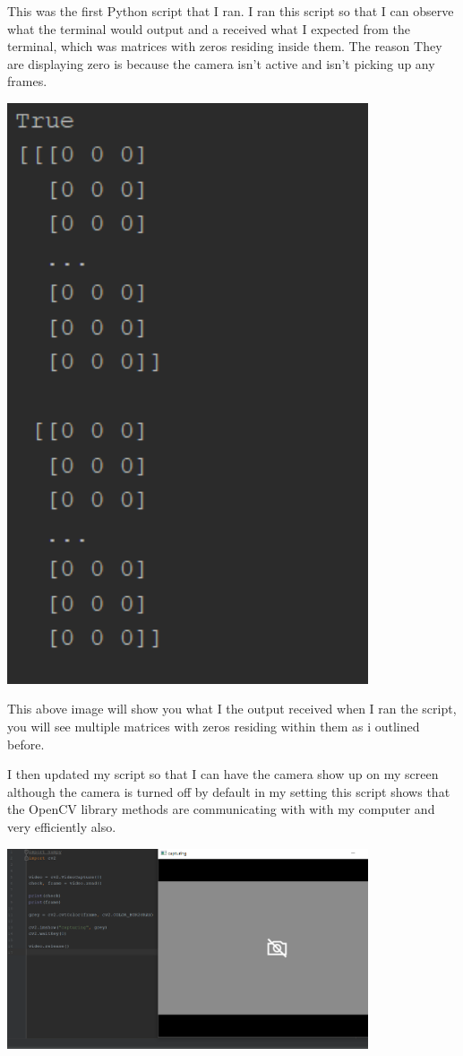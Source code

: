 This was the first Python script that I ran.  I ran this script so that I can observe what the terminal would output and a received what I expected from the terminal, which was matrices with zeros residing inside them. The reason They are displaying zero is because  the camera isn't active and isn't picking up any frames.

\includegraphics[width=0.8\textwidth]{Figures/terminalPythonScript.png}

This above image will show you what I the output received when I ran the script, you will see multiple matrices with zeros residing within them as i outlined before. 

I then updated my script so that I can have the camera show up on my screen although the camera is turned off by default in my setting this script shows that the OpenCV library methods are communicating with with my computer and very efficiently also.

\includegraphics[width=0.8\textwidth]{Figures/Pythonscriptwithcamera.png}

